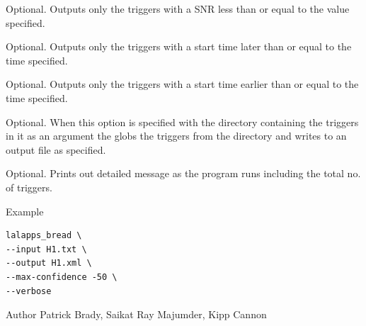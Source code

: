 \begin{entry}
\begin{entry}
\item[\option{--max-snr} \parm{snr}]
Optional. Outputs only the triggers with a SNR less than or equal to the
value specified.

\item[\option{--min-start-time} \parm{time}]
Optional. Outputs only the triggers with a start time later than or equal
to the time specified.

\item[\option{--max-start-time} \parm{time}]
Optional. Outputs only the triggers with a start time earlier than or equal
to the time specified.

\item[\option{--globtrig} \parm{globtrig}]
Optional.  When this option is specified with the directory containing the 
triggers in it as an argument the  globs the triggers
from the directory and writes to an output file as specified.
   
\item[\option{--verbose}]
Optional. Prints out detailed message as the program runs including the
total no. of triggers.

\end{entry}

\item[Example]
\begin{verbatim}
lalapps_bread \
--input H1.txt \
--output H1.xml \
--max-confidence -50 \
--verbose
\end{verbatim}

\item[Author] 
Patrick Brady, Saikat Ray Majumder, Kipp Cannon
\end{entry}
